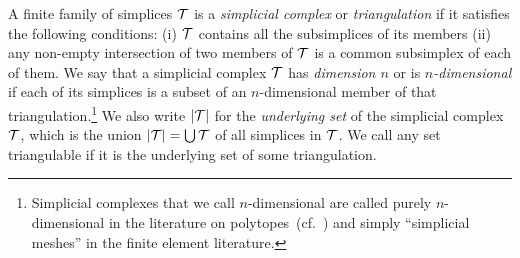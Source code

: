 \documentclass[10pt,a4paper]{article}
\begin{document}
A finite family of simplices ${\mathcal T}$ is a \emph{simplicial complex} or \emph{triangulation} if it satisfies the following conditions: 
(i) ${\mathcal T}$ contains all the subsimplices of its members (ii) any non-empty intersection of two members of ${\mathcal T}$ is a common subsimplex of each of them. 
We say that a simplicial complex ${\mathcal T}$ has \textit{dimension $n$} or is \textit{$n$-dimensional} if each of its simplices is a subset of an $n$-dimensional member of that triangulation.\footnote{Simplicial complexes that we call $n$-dimensional are called purely $n$-dimensional in the literature on polytopes~(cf.\ \cite{ziegler1995lectures}) and simply ``simplicial meshes'' in the finite element literature.} 
We also write $\left| {\mathcal T} \right|$ for the \textit{underlying set} of the simplicial complex ${\mathcal T}$, 
which is the union $\left| {\mathcal T} \right| = \bigcup {\mathcal T}$ of all simplices in ${\mathcal T}$.
We call any set triangulable if it is the underlying set of some triangulation. 


\begin{comment}
\begin{remark}
    Our main interest in this manuscript are finite triangulations of compact sets. 
    There is another reason why we insist on the triangulation being finite: 
    if we do not require our simplicial complexes to be finite,
    then a reasonable definition of simplicial complex would need additional topological conditions. 
    For example, if we modify our definition of simplicial complex to be infinite, 
    then any subset of Euclidean space would give rise to an ``infinite $0$-dimensional complex''. But this obviously does not reflect the topology. 
    A more interesting such example is this:
    the Cantor set $\calC \subseteq [0,1]$ is a compact set 
    that underlies an ``infinite $0$-dimensional simplicial complex''.
    If we place $\calC$ on the x-axis of a 2D coordinate system 
    and connect each member of $\calC$ to $(0,1) \in \bbR^{2}$ via a straight line segment, 
    then the resulting set is still compact, even path-connected,  
    but has an ``infinite $1$-dimensional triangulation''.
    However, none of these infinite families are infinite simplicial complexes in the sense of geometric topology~\cite{lee2011topological}. 
\end{remark}
\end{comment}
\end{document}
